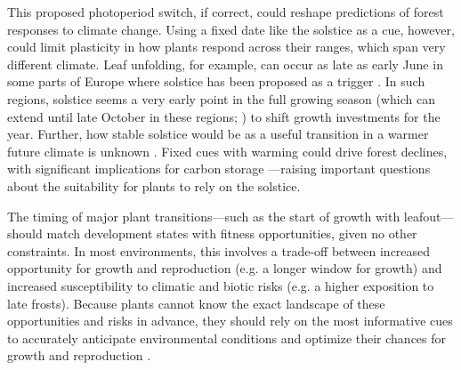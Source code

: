\documentclass[11pt,letter]{article}
\begin{document}
This proposed photoperiod switch, if correct, could reshape predictions of forest responses to climate change. 
Using a fixed date like the solstice as a cue, however, could limit plasticity in how plants respond across their ranges, which span very different climate. %
Leaf unfolding, for example, can occur as late as early June in some parts of Europe where solstice has been proposed as a trigger \citep{Zhang2022}. In such regions, solstice seems a very early point in the full growing season (which can extend until late October in these regions; \citealp{Liu2020}) to shift growth investments for the year. Further, how stable solstice would be as a useful transition %
in a warmer future climate is unknown \citep{Bonamour2019}. 
Fixed cues with warming could drive forest declines, with significant implications for carbon storage \citep{green2022limits}---raising important questions about the suitability for plants to rely on the solstice. 

The timing of major plant transitions---such as the start of growth with leafout---should match development states with fitness opportunities, given no other constraints. In most environments, this involves a trade-off between %
increased opportunity for growth and reproduction %
(e.g. a longer window for growth) and increased susceptibility to climatic and biotic risks (e.g. a higher exposition to late frosts). Because plants cannot know the exact landscape of these opportunities and risks in advance, they should rely on the most informative cues to accurately anticipate environmental conditions and optimize their chances for growth and reproduction \citep{Chevin2015, Bonamour2019}.
\end{document}
